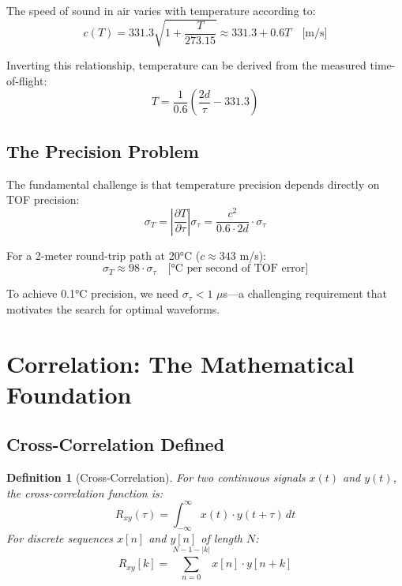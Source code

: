 \documentclass[11pt]{article}
\newtheorem{definition}{Definition}
\begin{document}
The speed of sound in air varies with temperature according to:
\begin{equation}
c(T) = 331.3\sqrt{1 + \frac{T}{273.15}} \approx 331.3 + 0.6T \quad \text{[m/s]}
\end{equation}

Inverting this relationship, temperature can be derived from the measured time-of-flight:
\begin{equation}
T = \frac{1}{0.6}\left(\frac{2d}{\tau} - 331.3\right)
\end{equation}

\subsection{The Precision Problem}

The fundamental challenge is that temperature precision depends directly on TOF precision:
\begin{equation}
\sigma_T = \left|\frac{\partial T}{\partial \tau}\right| \sigma_\tau = \frac{c^2}{0.6 \cdot 2d} \cdot \sigma_\tau
\end{equation}

For a 2-meter round-trip path at 20°C ($c \approx 343$ m/s):
\begin{equation}
\sigma_T \approx 98 \cdot \sigma_\tau \quad \text{[°C per second of TOF error]}
\end{equation}

To achieve 0.1°C precision, we need $\sigma_\tau < 1$ $\mu$s---a challenging requirement that motivates the search for optimal waveforms.

\section{Correlation: The Mathematical Foundation}

\subsection{Cross-Correlation Defined}

\begin{definition}[Cross-Correlation]
For two continuous signals $x(t)$ and $y(t)$, the cross-correlation function is:
\begin{equation}
R_{xy}(\tau) = \int_{-\infty}^{\infty} x(t) \cdot y(t + \tau) \, dt
\end{equation}
For discrete sequences $x[n]$ and $y[n]$ of length $N$:
\begin{equation}
R_{xy}[k] = \sum_{n=0}^{N-1-|k|} x[n] \cdot y[n + k]
\end{equation}
\end{definition}
\end{document}
